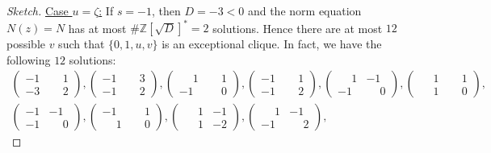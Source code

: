 \documentclass[10pt,a4paper]{amsart}
\newcommand{\Z}{\ensuremath{\mathbb{Z}}}
\begin{document}
\begin{proof}[Sketch]
		\underline{Case \(u=\zeta\):} If \(s=-1\), then \(D=-3<0\) and the norm equation \(N(z)=N\) has at most \(\#\Z[\sqrt{D}]^*=2\) solutions. Hence there are at most \(12\) possible \(v\) such that \(\{0,1,u,v\}\) is an exceptional clique. In fact, we have the following \(12\) solutions:
		\begin{align*}
			\left(\begin{smallmatrix}
				-1 & \phantom{-}1 \\
				-3 & \phantom{-}2
			\end{smallmatrix}\right),
			\left(\begin{smallmatrix}
				-1 & \phantom{-}3 \\
				-1 & \phantom{-}2
			\end{smallmatrix}\right),
			\left(\begin{smallmatrix}
				\phantom{-}1 & \phantom{-}1 \\
				-1 & \phantom{-}0
			\end{smallmatrix}\right),
			\left(\begin{smallmatrix}
				-1 & \phantom{-}1 \\
				-1 & \phantom{-}2
			\end{smallmatrix}\right),
			\left(\begin{smallmatrix}
				\phantom{-}1 & -1 \\
				-1 & \phantom{-}0
			\end{smallmatrix}\right),
			\left(\begin{smallmatrix}
				\phantom{-}1 & \phantom{-}1 \\
				\phantom{-}1 & \phantom{-}0
			\end{smallmatrix}\right), \\
			\left(\begin{smallmatrix}
				-1 & -1 \\
				-1 & \phantom{-}0
			\end{smallmatrix}\right),
			\left(\begin{smallmatrix}
				-1 & \phantom{-}1 \\
				\phantom{-}1 & \phantom{-}0
			\end{smallmatrix}\right),
			\left(\begin{smallmatrix}
				\phantom{-}1 & -1 \\
				\phantom{-}1 & -2
			\end{smallmatrix}\right),
			\left(\begin{smallmatrix}
				\phantom{-}1 & -1 \\
				-1 & \phantom{-}2
			\end{smallmatrix}\right),

\end{align*}
\end{proof}
\end{document}
